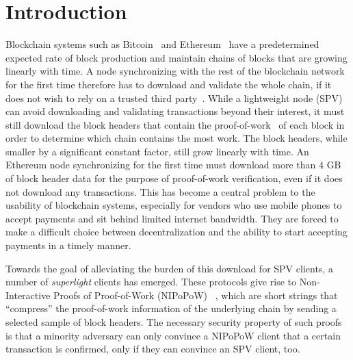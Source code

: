 \section{Introduction}
Blockchain systems such as Bitcoin~\cite{nakamoto} and
Ethereum~\cite{buterin,wood} have a predetermined expected rate of block
production and maintain chains of blocks that are growing linearly
with time. A node synchronizing with the rest of the blockchain
network for the first time therefore has to download and validate the whole
chain, if it does not wish to rely on a trusted third party~\cite{taxonomy}. While a lightweight
node (SPV) can avoid downloading and validating transactions beyond their
interest, it must still download the block headers that contain the
proof-of-work~\cite{pow} of each block in order to determine which chain contains
the most work. The block headers, while smaller by a significant constant
factor, still grow linearly with time. An Ethereum node synchronizing for the
first time must download more than $4$ GB of block header data for the purpose
of proof-of-work verification, even if it does not download any
transactions. This has become a central problem to the usability of blockchain
systems, especially for vendors who use mobile phones to accept payments
and sit behind limited internet bandwidth. They are forced to make a difficult
choice between decentralization and the ability to start accepting payments in a
timely manner.

Towards the goal of alleviating the burden of this download for SPV clients, a
number of \emph{superlight} clients has emerged.
These protocols give rise to  Non-Interactive Proofs of Proof-of-Work (NIPoPoW)
~\cite{nipopows}, which are short strings
 that ``compress'' the proof-of-work information of the underlying chain by sending a selected sample of block headers.
The necessary security property of such proofs is that a
minority adversary can only convince a
NIPoPoW client that a certain transaction is confirmed, only if they can
convince an SPV client, too.

